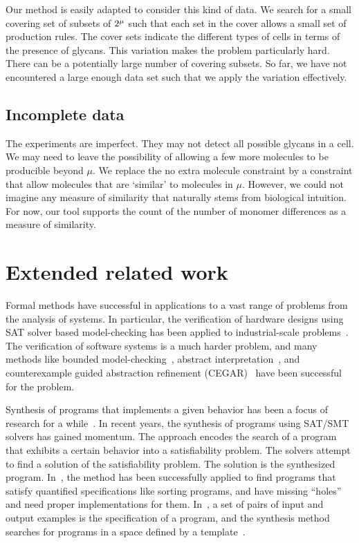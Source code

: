 \documentclass{llncs}
\begin{document}
Our method is easily adapted to consider this kind of data.
We search for a small covering set of subsets of
$2^{\mu}$ such that each set in the cover allows a small
set of production rules.
The cover sets indicate the different types of cells in terms of
the presence of glycans.
This variation makes the problem particularly hard.
There can be a potentially large number of covering subsets.
So far, we have not encountered a large enough data set such that
we apply the variation effectively. 


\subsection{Incomplete data}

The experiments are imperfect. They may not detect all possible glycans
in a cell.
We may need to leave the possibility of allowing a few more molecules to be
producible beyond $\mu$.
We replace the no extra molecule constraint by a constraint that allow molecules
that are `similar' to molecules in $\mu$.
However, we could not imagine any measure of similarity that naturally stems from
biological intuition.
For now, our tool supports the count of the number of monomer differences
as a measure of similarity.



\section{Extended related work}


Formal methods have successful in applications to a vast range of
problems from the analysis of systems.
%
In particular,
the verification of hardware designs
using SAT solver based model-checking has been applied
to industrial-scale problems~\cite{biere1999symbolic2}.
%
The verification of software systems is a much harder problem, and
many methods like bounded model-checking~\cite{biere2003bounded},
abstract interpretation~\cite{lattice77}, and
counterexample guided abstraction refinement (CEGAR)~\cite{ClarkeCEGAR} have
been successful for the problem.
%

Synthesis of programs that implements a given behavior
has been a focus of research for a while~\cite{PnueliSynthesis}.
%
In recent years, the synthesis of programs using SAT/SMT solvers
has gained momentum.
%
The approach encodes the search of a program that exhibits a certain
behavior into a satisfiability problem.
%
The solvers attempt to find a solution of the satisfiability problem.
%
The solution is the synthesized program.
%
In~\cite{SrivastavaSynthesis,Solar-Lezama2005},
the method has been successfully applied
to find programs that satisfy quantified specifications like sorting
programs, and have missing ``holes'' and need proper implementations
for them.
%
In~\cite{exampleSynth},
a set of pairs of input and output examples is the specification of a program,
and the synthesis method searches for programs in a space defined by a
template~\cite{sygus}.
\end{document}
